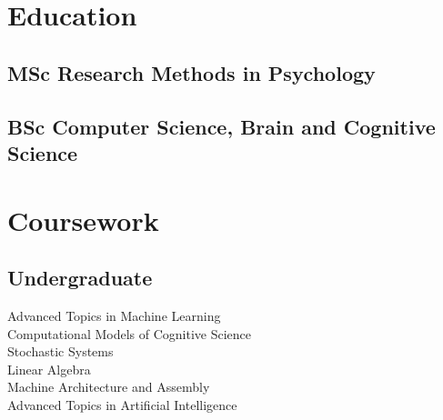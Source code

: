 \documentclass[]{csaund_resume-openfont}
\begin{document}
%
%

%
%

%
%

\begin{minipage}[t]{0.30\textwidth}


\section{Education}

\subsection{MSc Research Methods in Psychology}
\sectionsep

\subsection{BSc Computer Science, Brain and Cognitive Science}
\sectionsep




\section{Coursework}
\subsection{Undergraduate}
Advanced Topics in Machine Learning \\
Computational Models of Cognitive Science \\
Stochastic Systems \\
Linear Algebra \\
Machine Architecture and Assembly \\
Advanced Topics in Artificial Intelligence \\
\sectionsep


\end{minipage}
\end{document}
